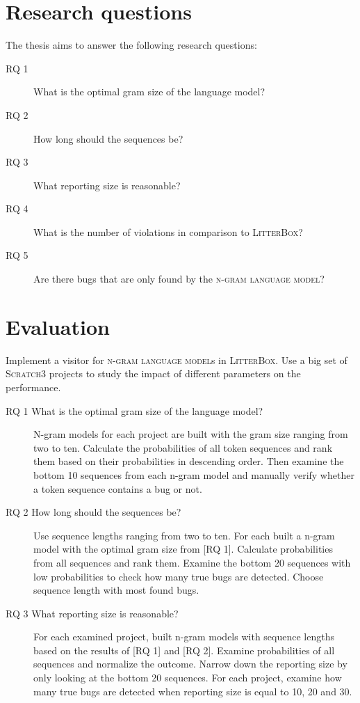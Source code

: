 \documentclass[
    numbers=noenddot,
    parskip=half-,
    fontsize=12pt,
    paper=a4,
    oneside,
    titlepage,
    bibliography=totoc,
    chapterprefix=false,
]{scrbook}
\newcommand{\ngram}{\textsc{n-gram language model}}
\newcommand{\litterbox}{\textsc{LitterBox}}
\newcommand{\scratch}{\textsc{Scratch}}
\begin{document}
    \chapter{Research questions}\label{ch:research-questions}
    The thesis aims to answer the following research questions:

    \begin{description}
        \item[RQ 1] What is the optimal gram size of the language model?
        \item[RQ 2] How long should the sequences be?
        \item[RQ 3] What reporting size is reasonable?
        \item[RQ 4] What is the number of violations in comparison to \litterbox{}?
        \item[RQ 5] Are there bugs that are only found by the \ngram{}?
    \end{description}


    \chapter{Evaluation}\label{ch:evaluation}
    
    Implement a visitor for \ngram{s} in \litterbox{}. Use a big set of \scratch{3} projects to study the impact of different parameters on the performance.  
    
    \begin{description}
        \item[RQ 1 What is the optimal gram size of the language model?] N-gram models for each project are built with the gram size ranging from two to ten. Calculate the probabilities of all token sequences and rank them based on their probabilities in descending order. Then examine the bottom 10 sequences from each n-gram model and manually verify whether a token sequence contains a bug or not.
        \item[RQ 2 How long should the sequences be?]
        Use sequence lengths ranging from two to ten. For each built a n-gram model with the optimal gram size from [RQ 1]. Calculate probabilities from all sequences and rank them. Examine the bottom 20 sequences with low probabilities to check how many true bugs are detected. Choose sequence length with most found bugs.
        \item[RQ 3 What reporting size is reasonable?]
        For each examined project, built n-gram models with sequence lengths based on the results of [RQ 1] and [RQ 2]. Examine probabilities of all sequences and normalize the outcome. Narrow down the reporting size by only looking at the bottom 20 sequences. For each project, examine how many true bugs are detected when reporting size is equal to 10, 20 and 30.
    \end{description}
\end{document}
